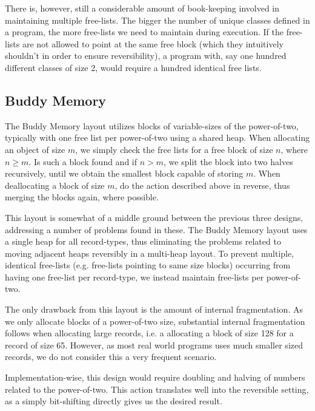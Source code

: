 There is, however, still a considerable amount of book-keeping involved in maintaining multiple free-lists. The bigger the number of unique classes defined in a program, the more free-lists we need to maintain during execution. If the free-lists are not allowed to point at the same free block (which they intuitively shouldn't in order to ensure reversibility), a program with, say one hundred different classes of size 2, would require a hundred identical free lists. 


\subsection{Buddy Memory}
\label{sec:buddy-memory}
The Buddy Memory layout utilizes blocks of variable-sizes of the power-of-two, typically with one free list per power-of-two using a shared heap. When allocating an object of size $m$, we simply check the free lists for a free block of size $n$, where $n \geq m$. Is such a block found and if $n > m$, we split the block into two halves recursively, until we obtain the smallest block capable of storing $m$. When deallocating a block of size $m$, do the action described above in reverse, thus merging the blocks again, where possible.

This layout is somewhat of a middle ground between the previous three designs, addressing a number of problems found in these. The Buddy Memory layout uses a single heap for all record-types, thus eliminating the problems related to moving adjacent heaps reversibly in a multi-heap layout. To prevent multiple, identical free-lists (e.g. free-lists pointing to same size blocks) occurring from having one free-list per record-type, we instead maintain free-lists per power-of-two.

The only drawback from this layout is the amount of internal fragmentation. As we only allocate blocks of a power-of-two size, substantial internal fragmentation follows when allocating large records, i.e. a allocating a block of size 128 for a record of size 65. However, as most real world programs uses much smaller sized records, we do not consider this a very frequent scenario.

Implementation-wise, this design would require doubling and halving of numbers related to the power-of-two. This action translates well into the reversible setting, as a simply bit-shifting directly gives us the desired result.

